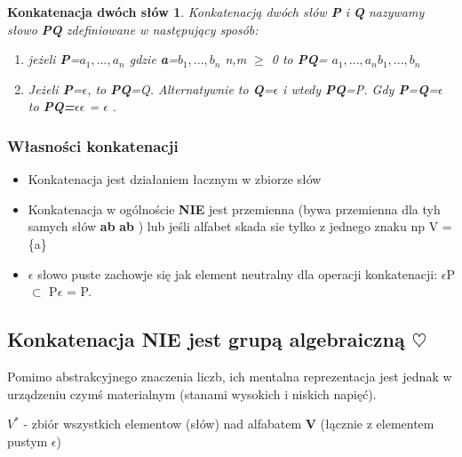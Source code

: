 \newtheorem*{theorema*}{Konkatenacja dwóch słów}
\begin{theorema*}
Konkatenacją dwóch słów {\bf P} i {\bf Q} nazywamy słowo {\bf PQ} zdefiniowane w następujący sposób:

\begin{enumerate}[label=(\roman*)]
  \item jeżeli {\bf P}=$a_{1}, ... ,a_{n}$ gdzie {\bf a}=$b_{1}, ... ,b_{n}$ n,m $\ge$ 0 to {\bf PQ}= $a_{1},...,a_{n}b_{1},...,b_{n}$
  \item Jeżeli {\bf P}=$\epsilon$, to {\bf PQ}=Q.\newline 
  Alternatywnie to {\bf Q}=$\epsilon$ i wtedy {\bf PQ}=P. \newline
  Gdy {\bf P}={\bf Q}=$\epsilon$ to {\bf PQ=}$\epsilon\epsilon$ = $\epsilon$ . 
\end{enumerate} 

 
 \end{theorema*}



\subsubsection{Własności konkatenacji}
\begin{itemize}
  \item Konkatenacja jest działaniem łacznym w zbiorze słów
  \item Konkatenacja w ogólnoście {\bf NIE} jest przemienna (bywa przemienna dla tyh samych słów {\bf ab} {\bf ab } ) lub jeśli alfabet skada sie tylko z jednego znaku np V = \{a\}
  \item $\epsilon$ słowo puste zachowje się jak element neutralny dla operacji konkatenacji: \newline $\epsilon$P $\subset$ 
  P$\epsilon$ = P.
\end{itemize}


\subsection{Konkatenacja NIE jest grupą algebraiczną  $\heartsuit$}
Pomimo abstrakcyjnego znaczenia liczb, ich mentalna reprezentacja jest jednak w urządzeniu czymś materialnym (stanami wysokich i niskich napięć).

 $V^{*}$ - zbiór wszystkich elementow (słów) nad alfabatem { \bf V} (łącznie z elementem pustym $\epsilon$)

